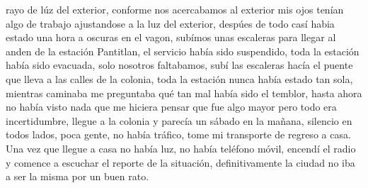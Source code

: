 \documentclass[letterpaper]{article}
\begin{document}
rayo de lúz del exterior, conforme nos acercabamos al exterior mis ojos tenían algo de trabajo
ajustandose a la luz del exterior, despúes de todo casí habia estado una hora a oscuras en el vagon,
subímos unas escaleras para llegar al anden de la estación Pantitlan, el servicio había sido
suspendido, toda la estación había sido evacuada, solo nosotros faltabamos, subí las escaleras hacía
el puente que lleva a las calles de la colonia, toda la estación nunca había estado tan sola,
mientras caminaba me preguntaba qué tan mal había sido el temblor, hasta ahora no había visto nada
que me hiciera pensar que fue algo mayor pero todo era incertidumbre, llegue a la colonia y parecía
un sábado en la mañana, silencio en todos lados, poca gente, no había tráfico, tome mi transporte de
regreso a casa. Una vez que llegue a casa no había luz, no había teléfono móvil, encendí el radio y
comence a escuchar el reporte de la situación, definitivamente la ciudad no iba a ser la
misma por un buen rato.
\end{document}
